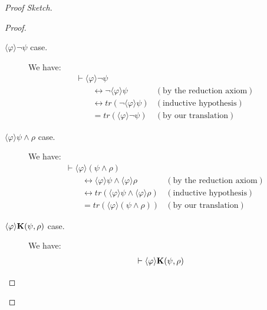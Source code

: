 \documentclass[letterpaper]{article}
\theoremstyle{definition}
\newenvironment{sketch}{\begin{proof}[Proof Sketch]}{\end{proof}}
\newcommand{\proves}{\vdash}
\newcommand{\Know}[2]{\textrm{\textup{\textbf{K}}}(#1, #2)}
\newcommand{\diaHebbop}[1]{\langle #1\rangle}
\begin{document}
\begin{sketch}
\begin{proof}
\begin{description}
\begin{description}
                \item[$\diaHebbop{\varphi} \neg \psi$ case.] We have:
                \[
                \begin{array}{ll}
                    \proves \diaHebbop{\varphi} \neg \psi
                    &  \\

                    \quad \quad \leftrightarrow
                    \neg \diaHebbop{\varphi} \psi 
                    & (\mbox{by the reduction axiom}) \\

                    \quad \quad \leftrightarrow
                    tr(\neg \diaHebbop{\varphi} \psi)
                    & (\mbox{inductive hypothesis}) \\

                    \quad \quad =
                    tr(\diaHebbop{\varphi} \neg \psi)
                    & (\mbox{by our translation})
                \end{array}
                \]
                
                \item[$\diaHebbop{\varphi} \psi \land \rho$ case.] We have:
                \[
                \begin{array}{ll}
                    \proves \diaHebbop{\varphi} (\psi \land \rho)
                    &  \\

                    \quad \quad \leftrightarrow
                    \diaHebbop{\varphi} \psi \land \diaHebbop{\varphi} \rho
                    & (\mbox{by the reduction axiom}) \\

                    \quad \quad \leftrightarrow
                    tr(\diaHebbop{\varphi} \psi \land \diaHebbop{\varphi} \rho)
                    & (\mbox{inductive hypothesis}) \\

                    \quad \quad =
                    tr(\diaHebbop{\varphi} (\psi \land \rho))
                    & (\mbox{by our translation})
                \end{array}
                \]
                
                \item[$\diaHebbop{\varphi} \Know{\psi}{\rho}$ case.] We have:
                \[
                \begin{array}{ll}
                    \proves \diaHebbop{\varphi} \Know{\psi}{\rho}
                    &  \\


\end{array}\]
\end{description}
\end{description}
\end{proof}
\end{sketch}
\end{document}
